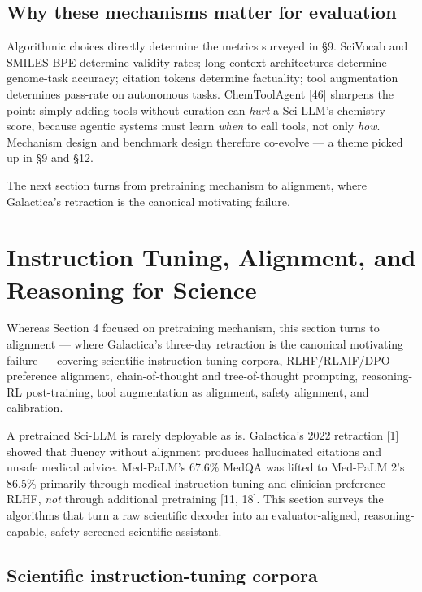 \subsection{Why these mechanisms matter for evaluation}\label{why-these-mechanisms-matter-for-evaluation}

Algorithmic choices directly determine the metrics surveyed in §9. SciVocab and SMILES BPE determine validity rates; long-context architectures determine genome-task accuracy; citation tokens determine factuality; tool augmentation determines pass-rate on autonomous tasks. ChemToolAgent {[}46{]} sharpens the point: simply adding tools without curation can \emph{hurt} a Sci-LLM's chemistry score, because agentic systems must learn \emph{when} to call tools, not only \emph{how}. Mechanism design and benchmark design therefore co-evolve --- a theme picked up in §9 and §12.

The next section turns from pretraining mechanism to alignment, where Galactica's retraction is the canonical motivating failure.

\section{Instruction Tuning, Alignment, and Reasoning for Science}\label{instruction-tuning-alignment-and-reasoning-for-science}

Whereas Section 4 focused on pretraining mechanism, this section turns to alignment --- where Galactica's three-day retraction is the canonical motivating failure --- covering scientific instruction-tuning corpora, RLHF/RLAIF/DPO preference alignment, chain-of-thought and tree-of-thought prompting, reasoning-RL post-training, tool augmentation as alignment, safety alignment, and calibration.

A pretrained Sci-LLM is rarely deployable as is. Galactica's 2022 retraction {[}1{]} showed that fluency without alignment produces hallucinated citations and unsafe medical advice. Med-PaLM's 67.6\% MedQA was lifted to Med-PaLM 2's 86.5\% primarily through medical instruction tuning and clinician-preference RLHF, \emph{not} through additional pretraining {[}11, 18{]}. This section surveys the algorithms that turn a raw scientific decoder into an evaluator-aligned, reasoning-capable, safety-screened scientific assistant.

\subsection{Scientific instruction-tuning corpora}\label{scientific-instruction-tuning-corpora}


